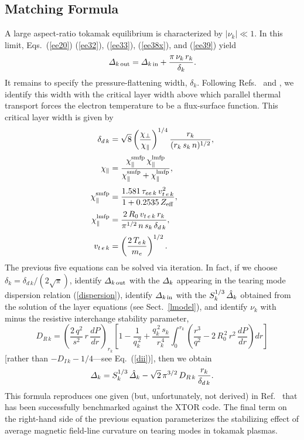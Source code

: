 \documentclass[12pt,prb,aps]{revtex4-1}
\begin{document}
\subsection{Matching Formula}
A large aspect-ratio tokamak equilibrium is characterized by $|\nu_k|\ll 1$. In this limit, Eqs.~(\ref{ee20}) (\ref{ee32}), (\ref{ee33}), (\ref{ee38x}), and (\ref{ee39}) yield
\begin{equation}
 {\mit\Delta}_{k\,{\rm out}} = {\mit\Delta}_{k\,{\rm in}}+ \frac{\pi\,\nu_k\,r_k}{\delta_k}.
 \end{equation}
It remains to specify the pressure-flattening width, $\delta_k$. Following Refs.~ and , we identify this width with the critical layer width above
which parallel thermal transport forces the electron temperature to be a flux-surface function. This critical layer width is given by\,\cite{hel,hel1}
\begin{align}
\delta_{d\,k}&= \sqrt{8}\left(\frac{\chi_\perp}{\chi_\parallel}\right)^{1/4}
\frac{r_k}{(r_k\,s_k\,n)^{1/2}},\\[0.5ex]
\chi_\parallel &= \frac{\chi_\parallel^{\rm smfp} \,\chi_\parallel^{\rm lmfp}}{\chi_\parallel^{\rm smfp}+\chi_\parallel^{\rm lmfp}},\\[0.5ex]
\chi_\parallel^{\rm smfp} &= \frac{1.581\,\tau_{ee\,k}\,v_{t\,e\,k}^2}{1+ 0.2535\,Z_{\rm eff}},\\[0.5ex]
\chi_\parallel^{\rm lmfp}&= \frac{2\,R_0\,v_{t\,e\,k}\,r_k}{\pi^{1/2}\,n\,s_k\,\delta_{d\,k}},\\[0.5ex]
v_{t\,e\,k} &= \left(\frac{2\,T_{e\,k}}{m_e}\right)^{1/2}.
\end{align}
The previous five equations can be solved via iteration. In fact, if we choose $\delta_k= \delta_{d\,k}/(2\sqrt{\pi})$, identify ${\mit\Delta}_{k\,{\rm out}}$ with the
${\mit\Delta}_k$ appearing in the tearing mode dispersion relation (\ref{dispersion}), identify ${\mit\Delta}_{k\,{\rm in}}$ with the $S_k^{1/3}\,\hat{\mit\Delta}_k$
obtained from the solution of the layer equations (see Sect.~\ref{lmodel}), and identify $\nu_k$ with minus the resistive interchange stability parameter,\cite{ggj,ggj1}
\begin{equation}
D_{R\,k} = \left(\frac{2\,q^2}{s^2}\,r\,\frac{dP}{dr}\right)_{r_k}\left[1-\frac{1}{q_k^{\,2}}+ \frac{q_k^{\,2}\,s_k}{r_k^{\,4}}\int_0^{r_k}
\left(\frac{r^3}{q^2} -2\,R_0^{\,2}\,r^2\,\frac{dP}{dr}\right)dr\right]
\end{equation}
 [rather than $-D_{I\,k}-1/4$---see Eq.~(\ref{dii})],\cite{kot}
then we obtain
\begin{equation}
{\mit\Delta}_k = S_k^{1/3}\,\hat{\mit\Delta}_k - \sqrt{2}\,\pi^{3/2}\,D_{R\,k}\,\frac{r_k}{\delta_{d\,k}}.
\end{equation}
This formula reproduces one given (but, unfortunately,  not derived) in Ref.~ that has been successfully benchmarked against the XTOR code. The final term on the right-hand side
of the previous equation parameterizes the stabilizing effect of average magnetic field-line curvature on tearing modes in tokamak plasmas. 
\end{document}
